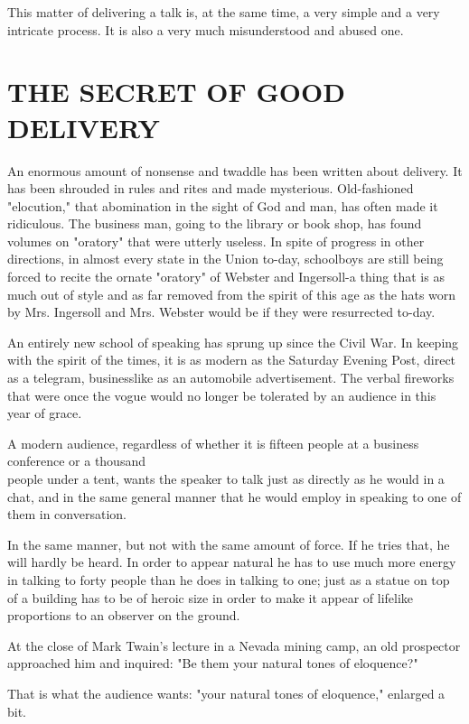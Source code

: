 \documentclass[10pt]{article}
\begin{document}
This matter of delivering a talk is, at the same time, a very simple and a very intricate process. It is also a very much misunderstood and abused one.

\section*{THE SECRET OF GOOD DELIVERY}
An enormous amount of nonsense and twaddle has been written about delivery. It has been shrouded in rules and rites and made mysterious. Old-fashioned "elocution," that abomination in the sight of God and man, has often made it ridiculous. The business man, going to the library or book shop, has found volumes on "oratory" that were utterly useless. In spite of progress in other directions, in almost every state in the Union to-day, schoolboys are still being forced to recite the ornate "oratory" of Webster and Ingersoll-a thing that is as much out of style and as far removed from the spirit of this age as the hats worn by Mrs. Ingersoll and Mrs. Webster would be if they were resurrected to-day.

An entirely new school of speaking has sprung up since the Civil War. In keeping with the spirit of the times, it is as modern as the Saturday Evening Post, direct as a telegram, businesslike as an automobile advertisement. The verbal fireworks that were once the vogue would no longer be tolerated by an audience in this year of grace.

A modern audience, regardless of whether it is fifteen people at a business conference or a thousand\\
people under a tent, wants the speaker to talk just as directly as he would in a chat, and in the same general manner that he would employ in speaking to one of them in conversation.

In the same manner, but not with the same amount of force. If he tries that, he will hardly be heard. In order to appear natural he has to use much more energy in talking to forty people than he does in talking to one; just as a statue on top of a building has to be of heroic size in order to make it appear of lifelike proportions to an observer on the ground.

At the close of Mark Twain's lecture in a Nevada mining camp, an old prospector approached him and inquired: "Be them your natural tones of eloquence?"

That is what the audience wants: "your natural tones of eloquence," enlarged a bit.
\end{document}
